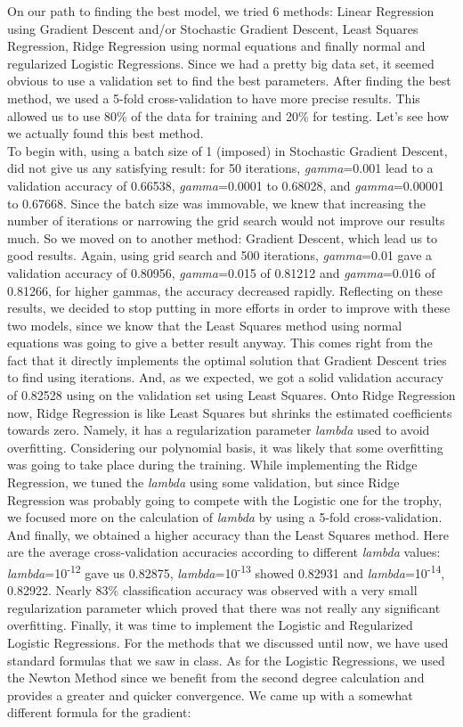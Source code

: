 \documentclass[journal]{IEEEtran}
\begin{document}
On our path to finding the best model, we tried 6 methods: Linear Regression using Gradient Descent and/or Stochastic Gradient Descent, Least Squares Regression, Ridge Regression using normal equations and finally normal and regularized Logistic Regressions. Since we had a pretty big data set, it seemed obvious to use a validation set to find the best parameters. After finding the best method, we used a 5-fold cross-validation to have more precise results. This allowed us to use 80\% of the data for training and 20\% for testing. Let's see how we actually found this best method.\\
To begin with, using a batch size of 1 (imposed) in Stochastic Gradient Descent, did not give us any satisfying result: for 50 iterations, \textit{gamma}=0.001 lead to a validation accuracy of 0.66538, \textit{gamma}=0.0001 to 0.68028, and \textit{gamma}=0.00001 to 0.67668. Since the batch size was immovable, we knew that increasing the number of iterations or narrowing the grid search would not improve our results much. So we moved on to another method: Gradient Descent, which lead us to good results. Again, using grid search and 500 iterations, \textit{gamma}=0.01 gave a validation accuracy of 0.80956, \textit{gamma}=0.015 of 0.81212 and \textit{gamma}=0.016 of 0.81266, for higher gammas, the accuracy decreased rapidly.
Reflecting on these results, we decided to stop putting in more efforts in order to improve with these two models, since we know that the Least Squares method using normal equations was going to give a better result anyway. This comes right from the fact that it directly implements the optimal solution that Gradient Descent tries to find using iterations. And, as we expected, we got a solid validation accuracy of 0.82528 using on the validation set using Least Squares.
Onto Ridge Regression now, Ridge Regression is like Least Squares but shrinks the estimated coefficients towards zero. Namely, it has a regularization parameter \textit{lambda} used to avoid  overfitting. Considering our polynomial basis, it was likely that some overfitting was going to take place during the training. While implementing the Ridge Regression, we tuned the \textit{lambda} using some validation, but since Ridge Regression was probably going to compete with the Logistic one for the trophy, we focused more on the calculation of \textit{lambda} by using a 5-fold cross-validation. And finally, we obtained a higher accuracy than the Least Squares method. Here are the average cross-validation accuracies according to different \textit{lambda} values:  \textit{lambda}=10\textsuperscript{-12} gave us 0.82875, \textit{lambda}=10\textsuperscript{-13} showed  0.82931 and \textit{lambda}=10\textsuperscript{-14}, 0.82922. Nearly 83\% classification accuracy was observed with a very small regularization parameter which proved that there was not really any significant overfitting.
Finally, it was time to implement the Logistic and Regularized Logistic Regressions. For the methods that we discussed until now, we have used standard formulas that we saw in class. As for the Logistic Regressions, we used the Newton Method since we benefit from the second degree calculation and provides a greater and quicker convergence. We came up with a somewhat different formula for the gradient:
\end{document}
